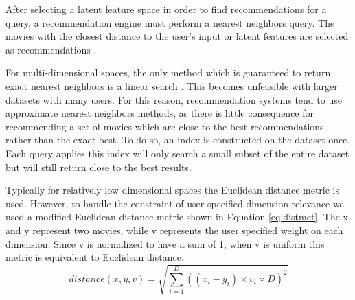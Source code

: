 After selecting a latent feature space in order to find recommendations for a query, a recommendation engine must perform a nearest neighbors query.  The movies with the closest distance to the user's input or latent features are selected as recommendations \cite{sarwar2001item}.

For multi-dimensional spaces, the only method which is guaranteed to return exact nearest neighbors is a linear search \cite{flann_pami_2014}.  This becomes unfeasible with larger datasets with many users.  For this reason, recommendation systems tend to use approximate nearest neighbors methods, as there is little consequence for recommending a set of movies which are close to the best recommendations rather than the exact best.  To do so, an index is constructed on the dataset once.  Each query applies this index will only search a small subset of the entire dataset but will still return close to the best results.

Typically for relatively low dimensional spaces the Euclidean distance metric is used.  However, to handle the constraint of user specified dimension relevance we used a modified Euclidean distance metric shown in Equation \ref{eq:distmet}.  The x and y represent two movies, while v represents the user specified weight on each dimension.  Since v is normalized to have a sum of 1, when v is uniform this metric is equivalent to Euclidean distance.
\begin{equation}
\label{eq:distmet}
distance(x,y,v) = \sqrt{\sum\limits_{i=1}^D ((x_i - y_i) \times v_i \times D)^2}
\end{equation}


